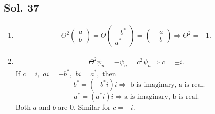 \subsection*{Sol. 37}
\begin{enumerate}
    \item \begin{align*}
        \Theta^2\begin{pmatrix}
            a\\b
        \end{pmatrix}
        =\Theta\begin{pmatrix}
            -b^*\\a^*
        \end{pmatrix}
        =\begin{pmatrix}
            -a\\-b
        \end{pmatrix}
        \Rightarrow \Theta^2=-1.
    \end{align*}
    \item 
    \begin{align*}
        \Theta^2\psi_n = -\psi_n = c^2\psi_n\Rightarrow c=\pm i.
    \end{align*}
    If $c=i,$ 
    $ai=-b^*,$ $bi=a^*,$ then $$
    -b^* = (-b^*i)i\Rightarrow \text{ b is imaginary, a is real}.
    $$
    $$
    a^* = (a^*i)i\Rightarrow \text{a is imaginary, b is real}.
    $$
    Both $a$ and $b$ are 0. Similar for $c=-i.$
                                                                                             
\end{enumerate}